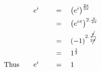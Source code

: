 \begin{alignat*}{5}
&\,&&e^i\quad&&\,=\quad\left(e^i\right)^\frac{2\pi}{2\pi}\\
&\,&&\quad&&\,=\quad\left(e^{i\pi}\right)^{2.\frac{\pi}{2\pi}}\\
&\,&&\quad&&\,=\quad(-1)^{2.\frac{\cancel{\pi}}{2\cancel{\pi}}}\\
&\,&&\quad&&\,=\quad1^\frac{1}{2}\\
&\text{Thus}\quad&&e^i\quad&&\,=\quad1
\end{alignat*}
